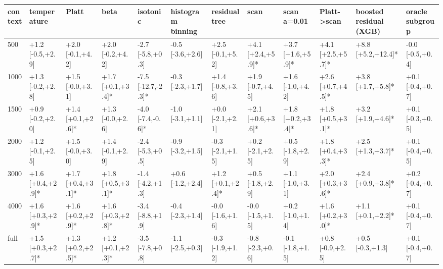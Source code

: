\begin{tabular}{llllllllllll}
\toprule
context & temperature & Platt & beta & isotonic & histogram binning & residual tree & scan & scan a=0.01 & Platt->scan & boosted residual (XGB) & oracle subgroup \\
\midrule
500 & +1.2 [-0.5,+2.9] & +2.0 [-0.1,+4.2] & +2.0 [-0.2,+4.2] & -2.7 [-5.8,+0.3] & -0.5 [-3.6,+2.6] & +2.5 [-0.1,+5.2] & +4.1 [+2.4,+5.9]* & +3.7 [+1.6,+5.9]* & +4.1 [+2.5,+5.7]* & +8.8 [+5.2,+12.4]* & -0.0 [-0.5,+0.4] \\
1000 & +1.3 [-0.2,+2.8] & +1.5 [-0.0,+3.1] & +1.7 [+0.1,+3.4]* & -7.5 [-12.7,-2.3]* & -0.3 [-2.3,+1.7] & +1.4 [-0.8,+3.6] & +1.9 [-0.7,+4.5] & +1.6 [-1.0,+4.2] & +2.6 [+0.7,+4.5]* & +3.8 [+1.7,+5.8]* & +0.1 [-0.4,+0.7] \\
1500 & +0.9 [-0.2,+2.0] & +1.4 [+0.1,+2.6]* & +1.3 [-0.0,+2.6] & -4.0 [-7.4,-0.6]* & -1.0 [-3.1,+1.1] & +0.0 [-2.1,+2.1] & +2.1 [+0.6,+3.6]* & +1.8 [+0.2,+3.4]* & +1.8 [+0.5,+3.1]* & +3.2 [+1.9,+4.6]* & +0.1 [-0.3,+0.5] \\
2000 & +1.2 [-0.1,+2.5] & +1.5 [-0.0,+3.0] & +1.4 [-0.1,+2.9] & -2.4 [-5.3,+0.5] & -0.9 [-3.2,+1.5] & -0.3 [-2.1,+1.5] & +0.2 [-2.1,+2.5] & +0.5 [-1.8,+2.9] & +1.8 [+0.4,+3.3]* & +2.5 [+1.3,+3.7]* & +0.1 [-0.4,+0.5] \\
3000 & +1.6 [+0.4,+2.9]* & +1.7 [+0.4,+3.1]* & +1.8 [+0.5,+3.1]* & -1.4 [-4.2,+1.3] & +0.6 [-1.2,+2.4] & +1.2 [+0.1,+2.4]* & +0.5 [-1.8,+2.9] & +1.1 [-1.0,+3.1] & +2.0 [+0.3,+3.6]* & +2.4 [+0.9,+3.8]* & +0.2 [-0.4,+0.7] \\
4000 & +1.6 [+0.3,+2.9]* & +1.6 [+0.2,+2.9]* & +1.6 [+0.3,+2.8]* & -3.4 [-8.8,+1.9] & -0.4 [-2.3,+1.4] & -0.0 [-1.6,+1.6] & -0.0 [-1.5,+1.5] & +0.2 [-1.0,+1.4] & +1.6 [+0.2,+3.0]* & +1.1 [+0.1,+2.2]* & +0.1 [-0.4,+0.7] \\
full & +1.5 [+0.3,+2.7]* & +1.3 [+0.2,+2.5]* & +1.2 [+0.1,+2.3]* & -3.5 [-7.8,+0.8] & -1.1 [-2.5,+0.3] & -0.3 [-1.9,+1.2] & -0.8 [-2.3,+0.6] & -0.1 [-1.8,+1.5] & +0.8 [-0.9,+2.5] & +0.5 [-0.3,+1.3] & +0.1 [-0.4,+0.7] \\
\bottomrule
\end{tabular}
